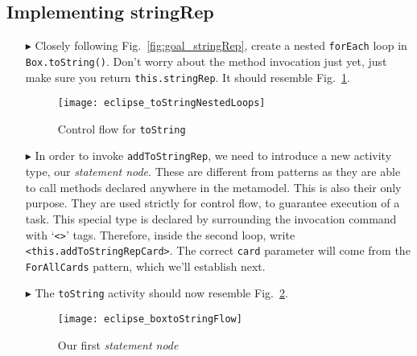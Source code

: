 \newpage
\hypertarget{stringRep tex}{}
\subsection{Implementing stringRep}
\texHeader

\vspace{0.5cm}

\begin{itemize}
  
\item[$\blacktriangleright$] Closely following Fig.~\ref{fig:goal_stringRep}, create a nested \texttt{forEach} loop in \texttt{Box.toString()}.
Don't worry about the method invocation just yet, just make sure you return \texttt{this.stringRep}. It should resemble Fig.~\ref{fig:emptyLoops}.

\begin{figure}[htp]
\begin{center}
  \texttt{[image: eclipse\_toStringNestedLoops]}
  \caption{Control flow for \texttt{toString}}
  \label{fig:emptyLoops}
\end{center}
\end{figure}

\item[$\blacktriangleright$] In order to invoke \texttt{addToStringRep}, we need to introduce a new activity type, our \emph{statement node}. These are
different from patterns as they are able to call methods declared anywhere in the metamodel. This is also their only purpose. They are used strictly for control
flow, to guarantee execution of a task. This special type is declared by surrounding the invocation command with  `\texttt{<>}' tags. Therefore, inside the
second loop, write \texttt{<this.addToStringRepCard>}. The correct \texttt{card} parameter will come from the \texttt{ForAllCards} pattern, which we'll
establish next.

\vspace{0.5cm}

\item[$\blacktriangleright$] The \texttt{toString} activity should now resemble Fig.~\ref{fig:toStringFlow}.

\vspace{0.5cm}

\begin{figure}[htp]
\begin{center}
  \texttt{[image: eclipse\_boxtoStringFlow]}
  \caption{Our first \emph{statement node}}
  \label{fig:toStringFlow}
\end{center}
\end{figure}


\end{itemize}
